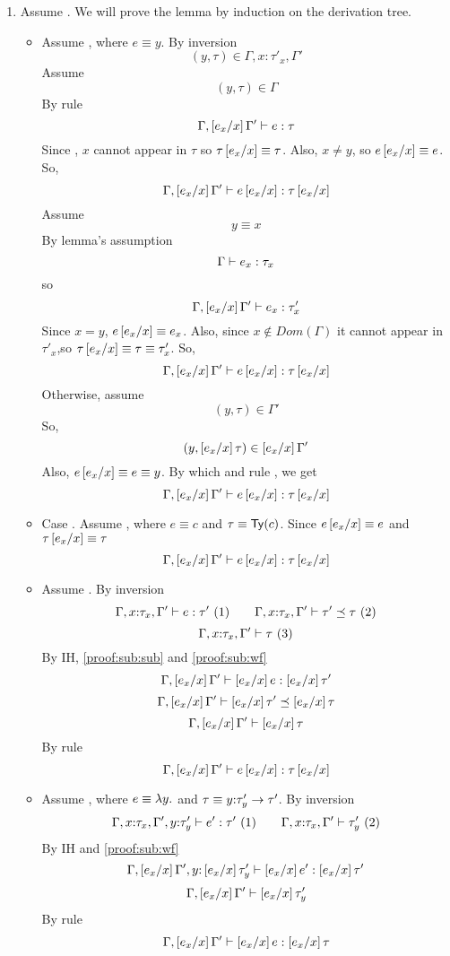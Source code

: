 \begin{enumerate}
\item \label{proof:sub:type} 
Assume 
	.
We will prove the lemma by induction on the derivation tree.
\begin{itemize}
\item \rtvar Assume ,
where $e \equiv y$.
By inversion 
$$(y,\tau )\in \Gamma, x\colon\tau'_x, \Gamma'$$
Assume
$$(y,\tau)\in \Gamma$$
By rule \rtvar
$$\hastype{\Gamma,\sub{x}{e_x}\Gamma'}{e}{\tau}$$
Since \iswellformed{}{\Gamma}, $x$ cannot appear in $\tau$
so $\tau\sub{x}{e_x}\equiv\tau$.
Also, $x\neq y$, so $e\sub{x}{e_x}\equiv e$.
So,
$$\hastype{\Gamma,\sub{x}{e_x}\Gamma'}{e\sub{x}{e_x}}{\tau\sub{x}{e_x}}$$
%
Assume
$$y \equiv x$$
By lemma's assumption 
$$\hastype{\Gamma}{e_x}{\tau_x}$$
so
$$\hastype{\Gamma,\sub{x}{e_x}\Gamma'}{e_x}{\tau'_x}$$
Since $x = y$, $e\sub{x}{e_x} \equiv e_x$.
Also, since $x \notin Dom(\Gamma)$ 
it cannot appear in $\tau'_x$,so
$\tau\sub{x}{e_x} \equiv \tau \equiv \tau'_x$.
So,
$$\hastype{\Gamma,\sub{x}{e_x}\Gamma'}{e\sub{x}{e_x}}{\tau\sub{x}{e_x}}$$
%
Otherwise, assume
$$(y,\tau)\in \Gamma'$$
So,
$$(y,\sub{x}{e_x}\tau)\in \sub{x}{e_x}\Gamma'$$
Also, $e\sub{x}{e_x}\equiv e \equiv y$.
By which and rule \rtvar, we get
$$\hastype{\Gamma,\sub{x}{e_x}\Gamma'}{e\sub{x}{e_x}}{\tau\sub{x}{e_x}}$$

\item Case \rtconst.
Assume ,
where $e \equiv c$ and $\tau\equiv\constty{c}$.
Since $e\sub{x}{e_x} \equiv e$ and $\tau\sub{x}{e_x}\equiv\tau$
$$\hastype{\Gamma,\sub{x}{e_x}\Gamma'}{e\sub{x}{e_x}}{\tau\sub{x}{e_x}}$$

\item\rtsub
Assume .
By inversion
$$
\hastype{\Gamma, x\colon\tau_x, \Gamma'}{e}{\tau'}\ (1)\qquad
\issubtype{\Gamma, x\colon\tau_x, \Gamma'}{\tau'}{\tau} \ (2)
$$
$$
\iswellformed{\Gamma, x\colon\tau_x, \Gamma'}{\tau} \ (3)
$$
By IH, \ref{proof:sub:sub} and \ref{proof:sub:wf}
$$
\hastype{\Gamma, \sub{x}{e_x}\Gamma'}{\sub{x}{e_x}e}{\sub{x}{e_x}\tau'}
$$
$$
\issubtype{\Gamma, \sub{x}{e_x}\Gamma'}{\sub{x}{e_x}\tau'}{\sub{x}{e_x}\tau}
$$
$$
\iswellformed{\Gamma, \sub{x}{e_x}\Gamma'}{\sub{x}{e_x}\tau}
$$
By rule \rtsub
$$\hastype{\Gamma,\sub{x}{e_x}\Gamma'}{e\sub{x}{e_x}}{\tau\sub{x}{e_x}}$$

\item\rtfun Assume ,
where $e\equiv\efun{y}{e'}$ and $\tau\equiv\tfun{y}{\tau'_y}{\tau'}$.
By inversion
	$$
	\hastype{\Gamma, x\colon\tau_x, \Gamma', y\colon\tau'_y}{e'}{\tau'}\ (1)\qquad
	\iswellformed{\Gamma, x\colon\tau_x, \Gamma'}{\tau'_y}\ (2)
	$$
By IH and \ref{proof:sub:wf}
	$$
	\hastype{\Gamma,\sub{x}{e_x} \Gamma', y\colon\sub{x}{e_x}\tau'_y}{\sub{x}{e_x}e'}{\sub{x}{e_x}\tau'} 	$$
	$$
	\iswellformed{\Gamma, \sub{x}{e_x}\Gamma'}{\sub{x}{e_x}\tau'_y}
	$$
	By rule \rtfun
	$$
	\hastype{\Gamma,\sub{x}{e_x} \Gamma'}{\sub{x}{e_x}e}{\sub{x}{e_x}\tau}
	$$
	

\end{itemize}
\end{enumerate}
